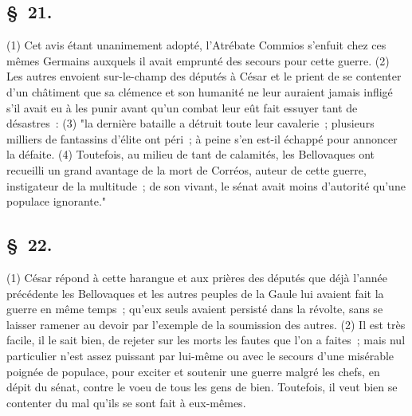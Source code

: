 \documentclass[french,twoside]{book} %
\begin{document}
\subsection[{§ 21.}]{ \textsc{§ 21.} }
\noindent (1) Cet avis étant unanimement adopté, l’Atrébate Commios s’enfuit chez ces mêmes Germains auxquels il avait emprunté des secours pour cette guerre. (2) Les autres envoient sur-le-champ des députés à César et le prient de se contenter d’un châtiment que sa clémence et son humanité ne leur auraient jamais infligé s’il avait eu à les punir avant qu’un combat leur eût fait essuyer tant de désastres : (3) "la dernière bataille a détruit toute leur cavalerie ; plusieurs milliers de fantassins d’élite ont péri ; à peine s’en est-il échappé pour annoncer la défaite. (4) Toutefois, au milieu de tant de calamités, les Bellovaques ont recueilli un grand avantage de la mort de Corréos, auteur de cette guerre, instigateur de la multitude ; de son vivant, le sénat avait moins d’autorité qu’une populace ignorante."
\subsection[{§ 22.}]{ \textsc{§ 22.} }
\noindent (1) César répond à cette harangue et aux prières des députés que déjà l’année précédente les Bellovaques et les autres peuples de la Gaule lui avaient fait la guerre en même temps ; qu’eux seuls avaient persisté dans la révolte, sans se laisser ramener au devoir par l’exemple de la soumission des autres. (2) Il est très facile, il le sait bien, de rejeter sur les morts les fautes que l’on a faites ; mais nul particulier n’est assez puissant par lui-même ou avec le secours d’une misérable poignée de populace, pour exciter et soutenir une guerre malgré les chefs, en dépit du sénat, contre le voeu de tous les gens de bien. Toutefois, il veut bien se contenter du mal qu’ils se sont fait à eux-mêmes.
\end{document}
